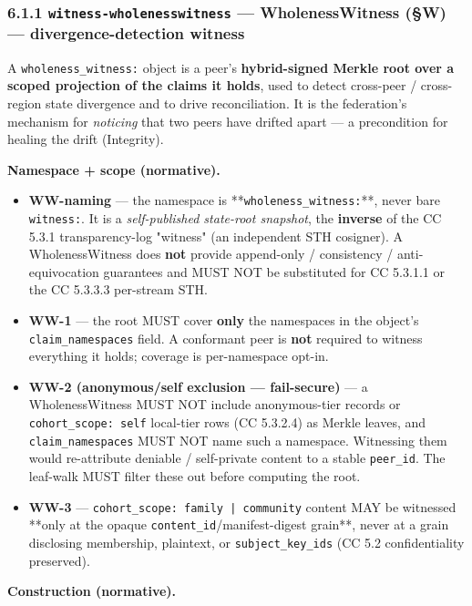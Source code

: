 \documentclass[11pt]{article}
\begin{document}
\subsubsection*{6.1.1 \texttt{witness-wholenesswitness} — WholenessWitness (§W) — divergence-detection witness}


A \texttt{wholeness\_witness:} object is a peer's \textbf{hybrid-signed Merkle root over a scoped projection of the claims it holds}, used to detect cross-peer / cross-region state divergence and to drive reconciliation. It is the federation's mechanism for \textit{noticing} that two peers have drifted apart — a precondition for healing the drift (Integrity).


\textbf{Namespace + scope (normative).}

\begin{itemize}\setlength\itemsep{0pt}
\item \textbf{WW-naming} — the namespace is **\texttt{wholeness\_witness:}**, never bare \texttt{witness:}. It is a \textit{self-published state-root snapshot}, the \textbf{inverse} of the CC 5.3.1 transparency-log "witness" (an independent STH cosigner). A WholenessWitness does \textbf{not} provide append-only / consistency / anti-equivocation guarantees and MUST NOT be substituted for CC 5.3.1.1 or the CC 5.3.3.3 per-stream STH.
\item \textbf{WW-1} — the root MUST cover \textbf{only} the namespaces in the object's \texttt{claim\_namespaces} field. A conformant peer is \textbf{not} required to witness everything it holds; coverage is per-namespace opt-in.
\item \textbf{WW-2 (anonymous/self exclusion — fail-secure)} — a WholenessWitness MUST NOT include anonymous-tier records or \texttt{cohort\_scope: self} local-tier rows (CC 5.3.2.4) as Merkle leaves, and \texttt{claim\_namespaces} MUST NOT name such a namespace. Witnessing them would re-attribute deniable / self-private content to a stable \texttt{peer\_id}. The leaf-walk MUST filter these out before computing the root.
\item \textbf{WW-3} — \texttt{cohort\_scope: family | community} content MAY be witnessed **only at the opaque \texttt{content\_id}/manifest-digest grain**, never at a grain disclosing membership, plaintext, or \texttt{subject\_key\_ids} (CC 5.2 confidentiality preserved).
\end{itemize}


\textbf{Construction (normative).}
\end{document}
